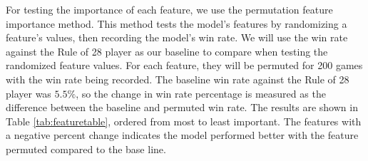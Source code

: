\documentclass[12pt]{article}
\begin{document}
\begin{thesis}
For testing the importance of each feature, we use the permutation feature importance method. This method tests the model's features by randomizing a feature's values, then recording the model's win rate. We will use the win rate against the Rule of 28 player as our baseline to compare when testing the randomized feature values. For each feature, they will be permuted for 200 games with the win rate being recorded. The baseline win rate against the Rule of 28 player was \(5.5\%\), so the change in win rate percentage is measured as the difference between the baseline and permuted win rate. The results are shown in Table \ref{tab:featuretable}, ordered from most to least important. The features with a negative percent change indicates the model performed better with the feature permuted compared to the base line.

\begingroup\fontsize{8}{10}\selectfont


\end{thesis}
\end{document}
